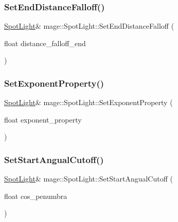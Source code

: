 \hypertarget{classmage_1_1_spot_light_a58a1aeffdcee3e54038cd2f40edd8a52}{}\label{classmage_1_1_spot_light_a58a1aeffdcee3e54038cd2f40edd8a52} 
\subsubsection{\texorpdfstring{Set\+End\+Distance\+Falloff()}{SetEndDistanceFalloff()}}
{\footnotesize\ttfamily \hyperlink{classmage_1_1_spot_light}{Spot\+Light}\& mage\+::\+Spot\+Light\+::\+Set\+End\+Distance\+Falloff (\begin{DoxyParamCaption}\item[{float}]{distance\+\_\+falloff\+\_\+end }\end{DoxyParamCaption})}

\hypertarget{classmage_1_1_spot_light_a5a53acd29a7796a16459284dc24b9044}{}\label{classmage_1_1_spot_light_a5a53acd29a7796a16459284dc24b9044} 
\subsubsection{\texorpdfstring{Set\+Exponent\+Property()}{SetExponentProperty()}}
{\footnotesize\ttfamily \hyperlink{classmage_1_1_spot_light}{Spot\+Light}\& mage\+::\+Spot\+Light\+::\+Set\+Exponent\+Property (\begin{DoxyParamCaption}\item[{float}]{exponent\+\_\+property }\end{DoxyParamCaption})}

\hypertarget{classmage_1_1_spot_light_a9ba061c92fda73430ba268a99a8d3ef6}{}\label{classmage_1_1_spot_light_a9ba061c92fda73430ba268a99a8d3ef6} 
\subsubsection{\texorpdfstring{Set\+Start\+Angual\+Cutoff()}{SetStartAngualCutoff()}}
{\footnotesize\ttfamily \hyperlink{classmage_1_1_spot_light}{Spot\+Light}\& mage\+::\+Spot\+Light\+::\+Set\+Start\+Angual\+Cutoff (\begin{DoxyParamCaption}\item[{float}]{cos\+\_\+penumbra }\end{DoxyParamCaption})}

